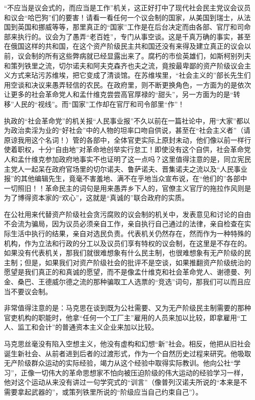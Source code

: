 “不应当是议会式的，而应当是工作”机关，这正好打中了现代社会民主党议会议员和议会“哈巴狗”们的要害！请看一看任何一个议会制的国家，从美国到瑞士，从法国到英国和挪威等等，那里真正的“国家”工作是在后台决定而由各部、官厅和司命部来执行的。议会为了愚弄“老百姓”，专门从事空谈。这是千真万确的事实，甚至在俄国这样的共和国，在这个资产阶级民主共和国还没有来得及建立真正的议会以前，议会制的所有这些弊病就已经显露出来了。腐朽的市侩英雄们，如斯柯别列夫和策列铁里之流，切尔诺夫和阿夫克森齐也夫之流，竟按最卑鄙的资产阶级议会主义方式来玷污苏维埃，把它变成了清谈馆。在苏维埃里，“社会主义的”部长先生们用空谈和决议来愚弄轻信的农民。在政府里，则不断更换角色，一方面为的是依次让更多的社会革命党人和孟什维克尝尝高官厚禄的“甜头”，另一方面为的是“转移”人民的“视线”。而“国家”工作却在官厅和司令部里“作”！

执政的“社会革命党”的机关报“人民事业报”不久以前在一篇社论中，用“大家”都以为政治卖淫为业的“好社会”中的人物的坦率口吻自供说，甚至在“社会主义者”（请原谅我用这个名词！）管的各部中，全体官吏实际上原封未动，他们像以前一样行使着职权，十分“自由地”对革命地创举实行怠工！即使没有这个自供，社会革命党人和孟什维克参加政府地事实不也证明了这一点吗？这里值得注意的是，同立宪民主党人一起呆在政府官场里的切尔诺夫、鲁萨诺夫、晋集诺夫之流以及“人民事业报”的其他编辑先生，竟毫不害羞地、满不在乎地当众宣布说，在“他们的”各部中一切照旧！！革命民主的词句是用来愚弄乡下人的，官僚主义官厅的拖拉作风则是为了博得资本家的“欢心”，这就是“真诚的”联合政府的{\kaishu 实质}。

在公社用来代替资产阶级社会贪污腐败的议会制的机关中，发表意见和讨论的自由不会流为骗局，因为议员必须亲自工作，亲自执行自己通过的法律，亲自检查在实际生活中执行的结果，亲自对选民负责。代表机关仍然存在，然而作为一种特殊的机构，作为立法和行政的分工以及议员们享有特权的议会制，在这里是{\kaishu 不存在}的。如果没有代表机关，那我们就很难想象有什么民主制，也很难想象有无产阶级的民主制；但是，如果我们对资产阶级社会的批评不是空谈，如果推翻资产阶级统治的愿望是我们真正的和真诚的愿望，而不是像孟什维克和社会革命党人、谢德曼、列金、桑巴、王德威尔德之流的那种骗取工人选票的“竞选”词句，那我们可以而且{\kaishu 应当}不要议会制。

非常值得注意的是：马克思在谈到既为公社需要、又为无产阶级民主制需要的{\kaishu 那种}官吏机构的职能时，他拿“任何一个工厂主”雇用的人员来加以比较，即拿雇用“工人、监工和会计”的普通资本主义企业来加以比较。

马克思丝毫没有陷入空想主义，他没有虚构和幻想“新”社会。相反，他把{\kaishu 从}旧社会{\kaishu 诞生}新社会、从前者进到后者的过渡形式，作为一个自然历史过程来研究。他吸取无产阶级群众运动的实际经验，竭力从这个经验中取得实际教训。他向公社“学习”，正像一切伟大的革命思想家不怕向被压迫阶级的伟大运动的经验学习一样，他对这个运动从来没有讲过一句学究式的“训言”（像普列汉诺夫所说的“本来是不需要拿起武器的”，或策列铁里所说的“阶级应当自己约束自己”）。

